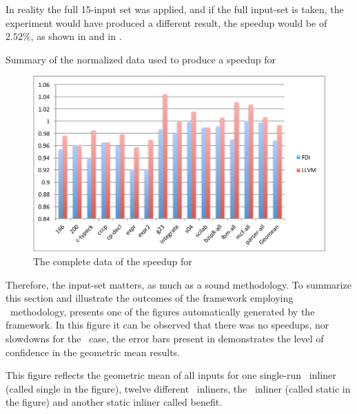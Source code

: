 In reality the full 15-input set was applied, and if the full input-set is taken, the experiment would have produced a different result, the speedup would be of $2.52 \%$, as shown in  and in .

\begin{table}
  \centering
  \begin{tiny}
  
  \end{tiny}
  \caption{Summary of the normalized data used to produce a speedup for \gcc}
  \label{tab:fullspeedup}
\end{table}

\begin{figure}
  \centering
  \includegraphics[width=1.00\linewidth]{Figures/speedupgccall}
  \caption{The complete data of the speedup for \gcc}
  \label{fig:gccall}
\end{figure}

Therefore, the input-set matters, as much as a sound methodology. To summarize this section and illustrate the outcomes of the framework employing \CP\ methodology,  presents one of the figures automatically generated by the framework. In this figure it can be observed that there was no speedups, nor slowdowns for the \gcc\ case, the error bars present in  demonstrates the level of confidence in the geometric mean results.

This figure reflects the geometric mean of all inputs for one single-run \FDI\ inliner (called single in the figure), twelve different \FDI\ inliners, the \llvm\ inliner (called static in the figure) and another static inliner called benefit.

